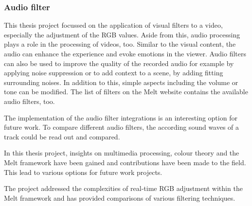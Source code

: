 \documentclass[../MasterThesis.tex]{subfiles}
\begin{document}
\subsubsection*{Audio filter}

This thesis project focussed on the application of visual filters to a video, especially the adjustment of the RGB values. Aside from this, audio processing plays a role in the processing of videos, too. Similar to the visual content, the audio can enhance the experience and evoke emotions in the viewer. Audio filters can also be used to improve the quality of the recorded audio for example by applying noise suppression or to add context to a scene, by adding fitting surrounding noises. In addition to this, simple aspects including the volume or tone can be modified.
The list of filters on the Melt website contains the available audio filters, too.~\cite{melt}

The implementation of the audio filter integrations is an interesting option for future work. To compare different audio filters, the according sound waves of a track could be read out and compared.




In this thesis project, insights on multimedia processing, colour theory and the Melt framework have been gained and contributions have been made to the field. This lead to various options for future work projects.

The project addressed the complexities of real-time RGB adjustment within the Melt framework and has provided comparisons of various filtering techniques. 


	
	
\end{document}
